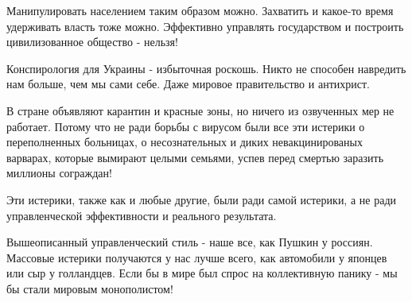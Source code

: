 Манипулировать населением таким образом можно. Захватить и какое-то время
удерживать власть тоже можно. Эффективно управлять государством и построить
цивилизованное общество -  нельзя!

Конспирология для Украины - избыточная роскошь. Никто не способен навредить нам
больше, чем мы сами себе. Даже мировое правительство и антихрист. 

В стране объявляют карантин и красные зоны, но ничего из озвученных мер не
работает. Потому что не ради борьбы с вирусом были все эти истерики о
переполненных больницах, о несознательных и диких невакцинированых варварах,
которые вымирают целыми семьями, успев перед смертью заразить миллионы
сограждан!

Эти истерики, также как и любые другие, были ради самой истерики, а не ради
управленческой эффективности и реального результата.

Вышеописанный управленческий стиль - наше все, как Пушкин у россиян. Массовые
истерики получаются у нас лучше всего, как автомобили у японцев или сыр у
голландцев. Если бы в мире был спрос на  коллективную панику - мы бы стали
мировым монополистом!


